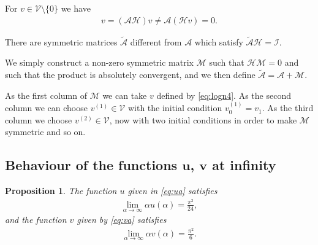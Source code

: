 \documentclass[pdftex]{sigma}
\numberwithin{equation}{section}
\newtheorem{prop}[thm]{Proposition}
\begin{document}
For $v\in\mathcal V\setminus\{0\}$ we have
\begin{gather*}
v=(\mathcal A\mathcal H)v\neq \mathcal A(\mathcal H v)=0.
\end{gather*}

\begin{rem}\label{thm:nonuniq2}There are symmetric matrices $\widetilde{\mathcal A}$ different from $\mathcal A$ which satisfy $\widetilde{\mathcal A}\mathcal H=\mathcal I$.

We simply construct a non-zero symmetric matrix $\mathcal M$ such that $\mathcal H\mathcal M=0$ and such that the product is absolutely convergent, and we then define $\widetilde{\mathcal A}=\mathcal A+\mathcal M$.

As the first column of $\mathcal M$ we can take $v$ defined by \eqref{eq:logn4}. As the second column we can choose $v^{(1)}\in\mathcal V$ with the initial condition $v^{(1)}_0=v_1$. As the third column we choose $v^{(2)}\in\mathcal V$, now with two initial conditions in order to make $\mathcal M$ symmetric and so on.
\end{rem}

\subsection[Behaviour of the functions $u$, $v$ at infinity]{Behaviour of the functions $\boldsymbol{u}$, $\boldsymbol{v}$ at infinity}

\begin{prop} The function $u$ given in \eqref{eq:ua} satisfies
\begin{gather}\label{eq:uainf}
\lim_{\alpha\to\infty}\alpha u(\alpha)=\frac{\pi^2}{24},
\end{gather}
and the function $v$ given by \eqref{eq:va} satisfies
\begin{gather}\label{eq:vainf}
\lim_{\alpha\to\infty}\alpha v(\alpha)=\frac{\pi^2}{6}.
\end{gather}
\end{prop}
\end{document}
